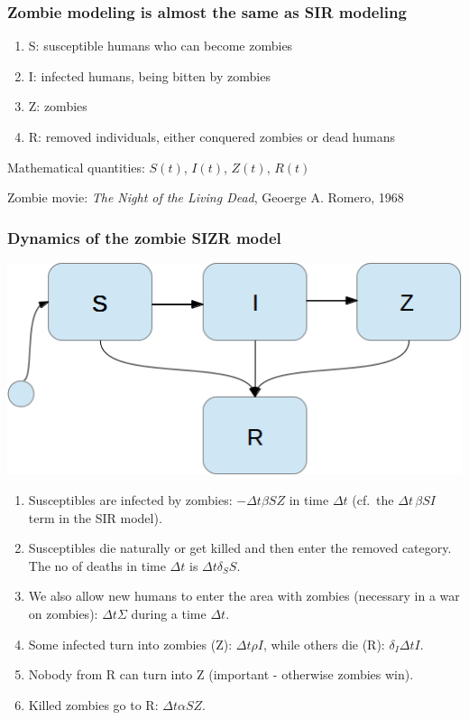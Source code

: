 \documentclass{beamer}
\newenvironment{block_mdfboxadmon}[1][]{\begin{block}{#1}}{\end{block}}
\begin{document}
\begin{frame}
\frametitle{Zombie modeling is almost the same as SIR modeling}

\begin{block_mdfboxadmon}[Categories.]
\begin{enumerate}
 \item S: susceptible humans who can become zombies

 \item I: infected humans, being bitten by zombies

 \item Z: zombies

 \item R: removed individuals, either conquered zombies or dead humans
\end{enumerate}

\noindent
\end{block_mdfboxadmon}



Mathematical quantities: $S(t)$, $I(t)$, $Z(t)$, $R(t)$

Zombie movie: \emph{The Night of the Living Dead}, Geoerge A. Romero, 1968
\end{frame}

\begin{frame}
\frametitle{Dynamics of the zombie SIZR model}

\begin{center}  %
  \centerline{\includegraphics[width=0.4\linewidth]{fig/categories_SIZR.png}}
\end{center}


\begin{enumerate}
 \item<2-> Susceptibles are infected by zombies: $-\Delta t\beta SZ$ in time $\Delta t$ (cf.~the $\Delta t\,\beta SI$ term in the SIR model).

 \item<3-> Susceptibles die naturally or get killed and then enter the removed category. The no of deaths in time $\Delta t$ is $\Delta t\delta_S S$.

 \item<4-> We also allow new humans to enter the area with zombies (necessary in a war on zombies): $\Delta t\Sigma$ during a time $\Delta t$.

 \item<5-> Some infected turn into zombies (Z): $\Delta t\rho I$, while others die (R): $\delta_I\Delta t I$.

 \item<6-> Nobody from R can turn into Z (important - otherwise zombies win).

 \item<7-> Killed zombies go to R: $\Delta t\alpha SZ$.
\end{enumerate}

\noindent
\end{frame}
\end{document}
